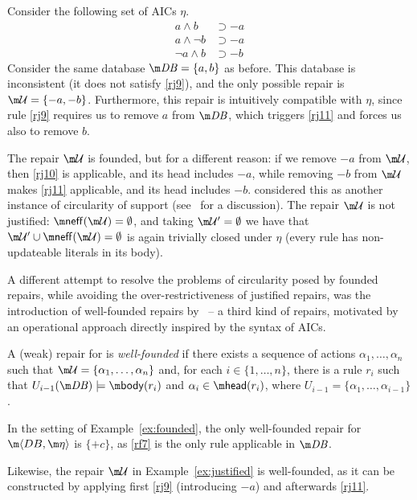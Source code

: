 \begin{example}
  \label{ex:justified}
  Consider the following set of AICs $\eta$.
  \begin{align}
  a\land b &\supset{-a} \label{rj9} \\
  a\land\neg b &\supset{-a}  \label{rj10} \\
  \neg a\land b &\supset{-b} \label{rj11}
  \end{align}
  Consider the same database $\db=\{a,b\}$ as before.
  This database is inconsistent (it does not satisfy \ref{rj9}), and the only possible repair is $\UU=\{{-a},{-b}\}$.
  Furthermore, this repair is intuitively compatible with $\eta$, since rule \ref{rj9} requires us to remove $a$ from $\db$, which triggers \ref{rj11} and forces us also to remove $b$.

  The repair $\UU$ is founded, but for a different reason: if we remove ${-a}$ from $\UU$, then \ref{rj10} is applicable, and its head includes $-a$, while removing ${-b}$ from $\UU$ makes \ref{rj11} applicable, and its head includes $-b$.
  \citet{tplp/CaropreseT11} considered this as another instance of circularity of support (see~\cite{tase/Cruz-FilipeEGN13} for a discussion).
  The repair $\UU$ is not justified: $\neff(\UU)=\emptyset$, and taking $\UU'=\emptyset$ we have that $\UU'\cup\neff(\UU)=\emptyset$ is again trivially closed under $\eta$ (every rule has non-updateable literals in its body).
\end{example}

A different attempt to resolve the problems of circularity posed by founded repairs, while avoiding the over-restrictiveness of justified repairs, was the introduction of well-founded repairs by~\citet{tase/Cruz-FilipeEGN13} -- a third kind of repairs, motivated by an operational approach directly inspired by the syntax of AICs.


\begin{definition}
 A (weak) repair \UU for \fulldb is \emph{well-founded} if there exists a sequence of actions $\alpha_1,\dots,\alpha_n$ such that $\UU=\{\alpha_1,\dots,\alpha_n\}$ and, for each $i\in\{1,\dots,n\}$, there is a rule $r_i$ such that $U_{i-1}(\db) \models \body (r_i)$ and $\alpha_i \in \head(r_i)$, where $U_{i-1} = \{\alpha_1,\dots,\alpha_{i-1}\}$.
\end{definition}

\begin{example}
  In the setting of Example~\ref{ex:founded}, the only well-founded repair for $\fulldb$ is $\{{+c}\}$, as \ref{rf7}  is the only rule applicable in $\db$.

  Likewise, the repair $\UU$ in Example~\ref{ex:justified} is well-founded, as it can be constructed by applying first \ref{rj9} (introducing ${-a}$) and afterwards \ref{rj11}.
\end{example}

